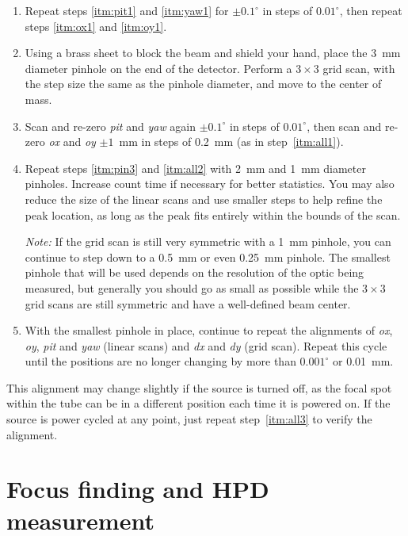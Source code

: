 \begin{enumerate}
\item \label{itm:all1} Repeat steps \ref{itm:pit1} and \ref{itm:yaw1} for $\pm 0.1 ^\circ$ in steps of $0.01^\circ$, then repeat steps \ref{itm:ox1} and \ref{itm:oy1}.

\item \label{itm:pin3} Using a brass sheet to block the beam and shield your hand, place the 3~mm diameter pinhole on the end of the detector. Perform a $3\times3$ grid scan, with the step size the same as the pinhole diameter, and move to the center of mass.

\item \label{itm:all2} Scan and re-zero \textit{pit} and \textit{yaw} again $\pm 0.1 ^\circ$ in steps of $0.01^\circ$, then scan and re-zero \textit{ox} and \textit{oy} $\pm 1$~mm in steps of 0.2~mm (as in step~\ref{itm:all1}).

\item Repeat steps \ref{itm:pin3} and \ref{itm:all2} with 2~mm and 1~mm diameter pinholes. Increase count time if necessary for better statistics. You may also reduce the size of the linear scans and use smaller steps to help refine the peak location, as long as the peak fits entirely within the bounds of the scan.

\textit{Note:} If the grid scan is still very symmetric with a 1~mm pinhole, you can continue to step down to a 0.5~mm or even 0.25~mm pinhole. The smallest pinhole that will be used depends on the resolution of the optic being measured, but generally you should go as small as possible while the $3\times3$ grid scans are still symmetric and have a well-defined beam center.

\item \label{itm:all3} With the smallest pinhole in place, continue to repeat the alignments of \textit{ox}, \textit{oy}, \textit{pit} and \textit{yaw} (linear scans) and \textit{dx} and \textit{dy} (grid scan). Repeat this cycle until the positions are no longer changing by more than $0.001^\circ$ or 0.01~mm.

\end{enumerate}
This alignment may change slightly if the source is turned off, as the focal spot within the tube can be in a different position each time it is powered on. If the source is power cycled at any point, just repeat step~\ref{itm:all3} to verify the alignment.

\section{Focus finding and HPD measurement\label{sec:focalign}}

